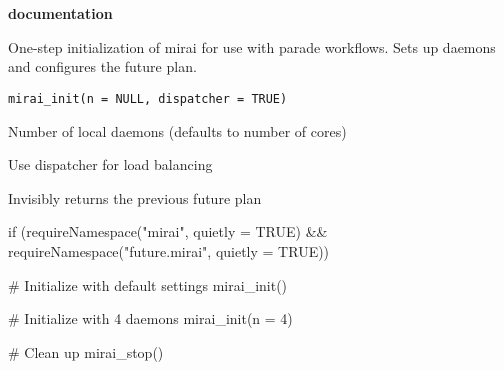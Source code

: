 \documentclass[a4paper]{book}
\begin{document}
\chapter*{}
\begin{center}
{\textbf{\huge \R{} documentation}} \par{}
\par\bigskip{\large \today}
\end{center}
%
\begin{Description}
One-step initialization of mirai for use with parade workflows.
Sets up daemons and configures the future plan.
\end{Description}
%
\begin{Usage}
\begin{verbatim}
mirai_init(n = NULL, dispatcher = TRUE)
\end{verbatim}
\end{Usage}
%
\begin{Arguments}
\begin{ldescription}
\item[\code{n}] Number of local daemons (defaults to number of cores)

\item[\code{dispatcher}] Use dispatcher for load balancing
\end{ldescription}
\end{Arguments}
%
\begin{Value}
Invisibly returns the previous future plan
\end{Value}
%
\begin{Examples}
\begin{ExampleCode}

if (requireNamespace("mirai", quietly = TRUE) && 
    requireNamespace("future.mirai", quietly = TRUE)) {
  # Initialize with default settings
  mirai_init()
  
  # Initialize with 4 daemons
  mirai_init(n = 4)
  
  # Clean up
  mirai_stop()
}

\end{ExampleCode}
\end{Examples}
\printindex{}
\end{document}
